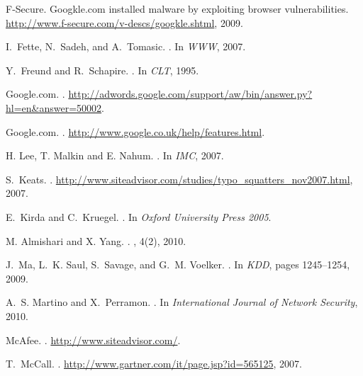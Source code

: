 \documentclass[twocolumn]{article}
\begin{document}
\begin{thebibliography}{10}
{F-Secure}.
\newblock Googkle.com installed malware by exploiting browser vulnerabilities.
\newblock \url{http://www.f-secure.com/v-descs/googkle.shtml}, 2009.

I.~Fette, N.~Sadeh, and A.~Tomasic.
.
\newblock In {\em WWW}, 2007.

Y.~Freund and R.~Schapire.
.
\newblock In {\em CLT}, 1995.

{Google.com}.
.
\newblock
  \url{http://adwords.google.com/support/aw/bin/answer.py?hl=en&answer=50002}.

{Google.com}.
.
\newblock \url{http://www.google.co.uk/help/features.html}.

{H. Lee, T. Malkin and E. Nahum}.
.
\newblock In {\em IMC}, 2007.

S.~Keats.
.
\newblock \url{http://www.siteadvisor.com/studies/typo_squatters_nov2007.html},
  2007.

E.~Kirda and C.~Kruegel.
.
\newblock In {\em Oxford University Press 2005}.

{M. Almishari and X. Yang}.
.
, 4(2), 2010.

J.~Ma, L.~K. Saul, S.~Savage, and G.~M. Voelker.
.
\newblock In {\em KDD}, pages 1245--1254, 2009.

A.~S. Martino and X.~Perramon.
.
\newblock In {\em International Journal of Network Security}, 2010.

{McAfee}.
.
\newblock \url{http://www.siteadvisor.com/}.

T.~McCall.
.
\newblock \url{http://www.gartner.com/it/page.jsp?id=565125}, 2007.


\end{thebibliography}
\end{document}
